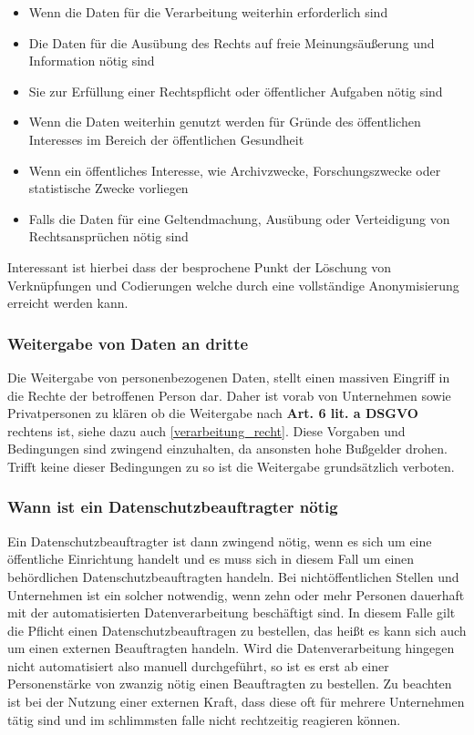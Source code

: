 \documentclass[a4paper, 12pt]{article}
\begin{document}
\begin{itemize}
	\item Wenn die Daten für die Verarbeitung weiterhin erforderlich sind
	\item Die Daten für die Ausübung des Rechts auf freie Meinungsäußerung und Information nötig sind
	\item Sie zur Erfüllung einer Rechtspflicht oder öffentlicher Aufgaben nötig sind
	\item Wenn die Daten weiterhin genutzt werden für Gründe des öffentlichen Interesses im Bereich der öffentlichen Gesundheit
	\item Wenn ein öffentliches Interesse, wie Archivzwecke, Forschungszwecke oder statistische Zwecke vorliegen
	\item Falls die Daten für eine Geltendmachung, Ausübung oder Verteidigung von Rechtsansprüchen nötig sind
\end{itemize}
Interessant ist hierbei dass der besprochene Punkt der Löschung von Verknüpfungen und Codierungen welche durch eine vollständige Anonymisierung erreicht werden kann.
\subsubsection{Weitergabe von Daten an dritte}
Die Weitergabe von personenbezogenen Daten, stellt einen massiven Eingriff in die Rechte der betroffenen Person dar. Daher ist vorab von Unternehmen sowie Privatpersonen zu klären ob die Weitergabe nach \textbf{Art. 6 lit. a DSGVO} rechtens ist, siehe dazu auch \ref{verarbeitung_recht}. Diese Vorgaben und Bedingungen sind zwingend einzuhalten, da ansonsten hohe Bußgelder drohen. Trifft keine dieser Bedingungen zu so ist die Weitergabe grundsätzlich verboten.
\subsubsection{Wann ist ein Datenschutzbeauftragter nötig}
Ein Datenschutzbeauftragter ist dann zwingend nötig, wenn es sich um eine öffentliche Einrichtung handelt und es muss sich in diesem Fall um einen behördlichen Datenschutzbeauftragten handeln. Bei nichtöffentlichen Stellen und Unternehmen ist ein solcher notwendig, wenn zehn oder mehr Personen dauerhaft mit der automatisierten Datenverarbeitung beschäftigt sind. In diesem Falle gilt die Pflicht einen Datenschutzbeauftragen zu bestellen, das heißt es kann sich auch um einen externen Beauftragten handeln. Wird die Datenverarbeitung hingegen nicht automatisiert also manuell durchgeführt, so ist es erst ab einer Personenstärke von zwanzig nötig einen Beauftragten zu bestellen. Zu beachten ist bei der Nutzung einer externen Kraft, dass diese oft für mehrere Unternehmen tätig sind und im schlimmsten falle nicht rechtzeitig reagieren können.
\end{document}
